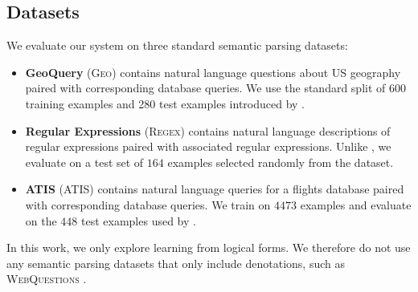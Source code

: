 \documentclass[11pt,letterpaper]{article}
\newcommand{\atis}{\textsc{ATIS}\xspace}
\newcommand{\regex}{\textsc{Regex}\xspace}
\newcommand{\geo}{\textsc{Geo}\xspace}
\begin{document}
\subsection{Datasets}

We evaluate our system on three standard semantic parsing datasets:
\begin{itemize}
  \item \textbf{GeoQuery} (\geo) contains
  natural language questions about US geography
  paired with corresponding database queries.
  We use the standard split of 600 training examples and 280 test examples
  introduced by .

  \item \textbf{Regular Expressions} (\regex)
  contains natural language descriptions of regular expressions
  paired with associated regular expressions.
  Unlike , 
  we evaluate on a test set of $164$ examples selected randomly
  from the dataset.

  \item \textbf{ATIS} (\atis) contains 
    natural language queries for a flights database
    paired with corresponding database queries.
    We train on $4473$ examples and evaluate on the $448$
    test examples used by 
    .
\end{itemize}


In this work, we only explore learning from logical forms.
We therefore do not use any semantic parsing datasets
that only include denotations,
such as \textsc{WebQuestions} \cite{berant2013freebase}.
\end{document}
